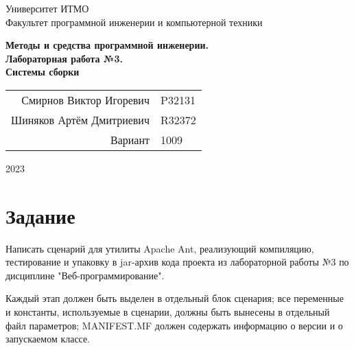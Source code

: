 \documentclass{article}
\begin{document}
\begin{titlepage}
  \begin{center}
    \begin{spacing}{1.4}
      \large{Университет ИТМО} \\
      \large{Факультет программной инженерии и компьютерной техники} \\
    \end{spacing}
    \vfill
    \textbf{
      \huge{Методы и средства программной инженерии.} \\
      \huge{Лабораторная работа №3.} \\
      \huge{Системы сборки} \\
    }
  \end{center}
  \vfill
  \begin{center}
    \begin{tabular}{r l}
      Смирнов Виктор Игоревич  & P32131 \\
      Шиняков Артём Дмитриевич & R32372 \\
      Вариант                  & 1009   \\
    \end{tabular}
  \end{center}
  \vfill
  \begin{center}
    \begin{large}
      2023
    \end{large}
  \end{center}
\end{titlepage}

\tableofcontents

\section{Задание}

Написать сценарий для утилиты Apache Ant, 
реализующий компиляцию, тестирование и 
упаковку в jar-архив кода проекта из лабораторной 
работы №3 по дисциплине "Веб-программирование".

Каждый этап должен быть выделен в отдельный блок сценария; 
все переменные и константы, используемые в сценарии, 
должны быть вынесены в отдельный файл параметров; 
MANIFEST.MF должен содержать информацию о версии и о 
запускаемом классе.
\end{document}
